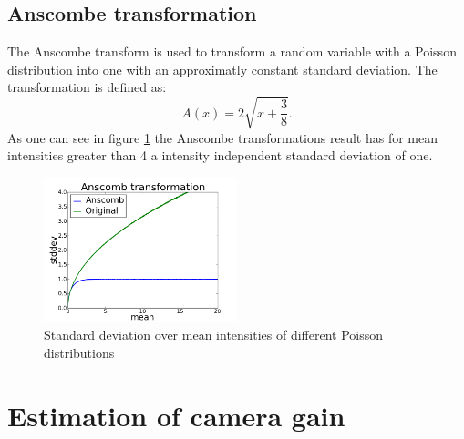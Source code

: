 \subsection{Anscombe transformation}
\label{trafoAnscombe}
The Anscombe transform \cite{anscombe} is used to transform a random variable with a Poisson
distribution into one with an approximatly constant standard deviation. The
transformation is defined as:
\begin{equation}
	A(x) = 2\sqrt{x+\frac{3}{8}}.
\end{equation}
As one can see in figure \ref{anscombe} the Anscombe transformations result has
for mean intensities greater than 4 a intensity independent standard deviation of
one.
\begin{figure}
	\centering
	\includegraphics[width = 0.5\textwidth]{pictures/anscombe.png}
	\caption{Standard deviation over mean intensities of different Poisson
	distributions}
	\label{anscombe}
	
\end{figure}

\section{Estimation of camera gain}
